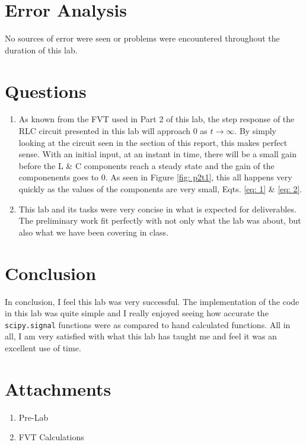 \documentclass[12pt]{report}
\begin{document}
\section{Error Analysis}\label{section: ErAn}
No sources of error were seen or problems were encountered throughout the duration of this lab. 
\section{Questions}
\begin{enumerate}
  \item As known from the FVT used in Part 2 of this lab, the step response of the RLC circuit presented in this lab will approach 0 as $t\to\infty$. By simply
  looking at the circuit seen in the  section of this report, this makes perfect sense. With an initial input, at an instant in time,
  there will be a small gain before the L \& C components reach a steady state and the gain of the componenents goes to 0. As seen in Figure \ref{fig: p2t1}, this all
  happens very quickly as the values of the components are very small, Eqts. \eqref{eq: 1} \& \eqref{eq: 2}. 
  \item This lab and its tasks were very concise in what is expected for deliverables. The preliminary work fit perfectly with not only what the lab was about,
  but also what we have been covering in class.
\end{enumerate}
\section{Conclusion}
In conclusion, I feel this lab was very successful. The implementation of the code in this lab was quite simple and I really enjoyed seeing how accurate the 
\texttt{scipy.signal} functions were as compared to hand calculated functions. All in all, I am very satisfied with what this lab has taught me and feel it was an excellent use of time.
\newpage
\thispagestyle{customblank}
\section{Attachments}\label{section: Attachments}
\centering\begin{enumerate}
  \item Pre-Lab
  \item FVT Calculations
\end{enumerate}
\vspace*{\fill}





\end{document}
